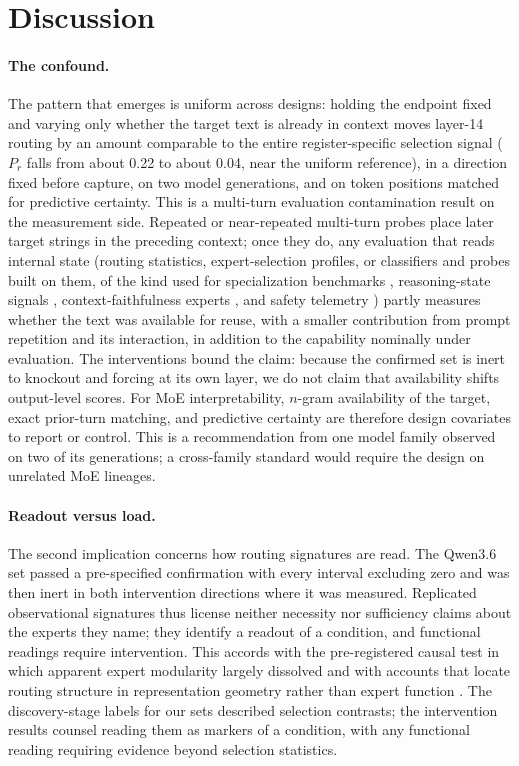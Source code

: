\documentclass[10pt,a4paper,twocolumn]{article}
\begin{document}
\section{Discussion}\label{sec:discussion}

\paragraph{The confound.}
The pattern that emerges is uniform across designs: holding the endpoint fixed
and varying only whether the target text is already in context moves
layer-14 routing by an amount comparable to the entire register-specific
selection signal (\(P_r\) falls from about 0.22 to about 0.04, near the
uniform reference), in a direction fixed before capture, on two model
generations, and on token positions matched for predictive certainty. This is
a multi-turn evaluation contamination result on the measurement side.
Repeated or near-repeated multi-turn probes place later target strings in the
preceding context; once they do, any evaluation that reads internal state
(routing statistics, expert-selection profiles, or classifiers and probes
built on them, of the kind used for specialization benchmarks
\cite{wang2026dbes}, reasoning-state signals \cite{chen2026},
context-faithfulness experts \cite{bai2025}, and safety telemetry
\cite{lv2026}) partly measures whether the text was available for reuse,
with a smaller contribution from prompt repetition and its interaction, in
addition to the capability nominally under evaluation. The interventions
bound the claim: because the confirmed set is inert to knockout and forcing at
its own layer, we do not claim that availability shifts output-level scores.
For MoE interpretability, \(n\)-gram availability of the target, exact
prior-turn matching, and predictive certainty are therefore design covariates
to report or control. This is a recommendation from one model family observed
on two of its generations; a cross-family standard would require the design
on unrelated MoE lineages.

\paragraph{Readout versus load.}
The second implication concerns how routing signatures are read. The
Qwen3.6 set passed a pre-specified confirmation with every interval
excluding zero and was then inert in both intervention directions where it
was measured. Replicated observational signatures thus license neither
necessity nor sufficiency claims about the experts they name; they identify a
readout of a condition, and functional readings require intervention. This
accords with the pre-registered causal test in which apparent expert
modularity largely dissolved \cite{salomone2026} and with accounts that
locate routing structure in representation geometry rather than expert
function \cite{wang2026myth}. The discovery-stage labels for our sets
described selection contrasts; the intervention results counsel reading them
as markers of a condition, with any functional reading requiring evidence
beyond selection statistics.
\end{document}
